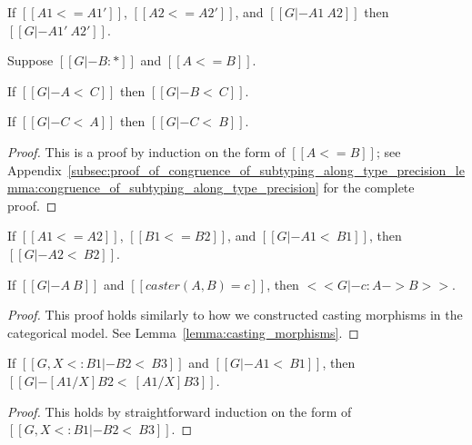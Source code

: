 \begin{corollary}
  \label{corollary:congruence_of_type_consistency_along_type_precision}
  If $[[A1 <= A1']]$, $[[A2 <= A2']]$, and $[[G |- A1 ~ A2]]$ then
  $[[G |- A1' ~ A2']]$.  
\end{corollary}

\begin{lemma}
  \label{lemma:congruence_of_subtyping_along_type_precision}
  Suppose $[[G |- B : *]]$ and $[[A <= B]]$.
  \begin{enumR}
  \item If $[[G |- A <~ C]]$ then $[[G |- B <~ C]]$.

  \item If $[[G |- C <~ A]]$ then $[[G |- C <~ B]]$.  
  \end{enumR}
\end{lemma}
\begin{proof}
  This is a proof by induction on the form of $[[A <= B]]$; see
  Appendix~\ref{subsec:proof_of_congruence_of_subtyping_along_type_precision_lemma:congruence_of_subtyping_along_type_precision}
  for the complete proof.
\end{proof}

\begin{corollary}
  \label{corollary:congruence_of_subtyping_along_type_precision}
  If $[[A1 <= A2]]$, $[[B1 <= B2]]$, and $[[G |- A1 <~ B1]]$, then $[[G |- A2 <~ B2]]$.
\end{corollary}


\begin{lemma}
  \label{lemma:typing_casting_morphisms}
  If $[[G |- A ~ B]]$ and $[[caster(A,B) = c]]$, then $<<G |- c : A -> B>>$.
\end{lemma}
\begin{proof}
  This proof holds similarly to how we constructed casting morphisms in the categorical
  model.  See Lemma~\ref{lemma:casting_morphisms}.
\end{proof}

\begin{lemma}
  \label{lemma:substitution_for_consistent_subtyping}
  If $[[G, X <: B1 |- B2 <~ B3]]$ and $[[G |- A1 <~ B1]]$, then $[[G |- [A1/X]B2 <~ [A1/X]B3]]$.
\end{lemma}
\begin{proof}
  This holds by straightforward induction on the form of $[[G, X <: B1 |- B2 <~ B3]]$.
\end{proof}

